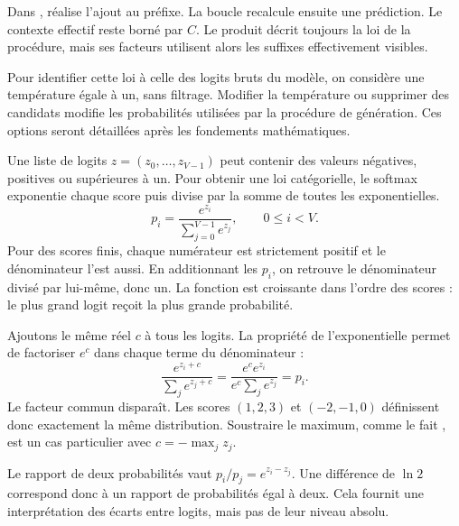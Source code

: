 Dans , 
réalise l'ajout au préfixe. La boucle recalcule ensuite une
prédiction. Le contexte effectif reste borné par \(C\).
Le produit décrit toujours la loi de la procédure, mais ses
facteurs utilisent alors les suffixes effectivement visibles.

Pour identifier cette loi à celle des logits bruts du modèle,
on considère une température égale à un, sans filtrage.
Modifier la température ou supprimer des candidats modifie les
probabilités utilisées par la procédure de génération.
Ces options seront détaillées après les fondements mathématiques.



Une liste de logits \(z=(z_0,\ldots,z_{V-1})\) peut contenir
des valeurs négatives, positives ou supérieures à un. Pour obtenir
une loi catégorielle, le softmax exponentie chaque score puis divise
par la somme de toutes les exponentielles.
\[
 p_i=\frac{e^{z_i}}{\sum_{j=0}^{V-1}e^{z_j}},
 \qquad 0\leq i<V.
\]
Pour des scores finis, chaque numérateur est strictement positif
et le dénominateur l'est aussi. En additionnant les \(p_i\),
on retrouve le dénominateur divisé par lui-même, donc un.
La fonction est croissante dans l'ordre des scores :
le plus grand logit reçoit la plus grande probabilité.

Ajoutons le même réel \(c\) à tous les logits. La propriété
de l'exponentielle permet de factoriser \(e^c\) dans chaque
terme du dénominateur :
\[
 \frac{e^{z_i+c}}{\sum_j e^{z_j+c}}
 =\frac{e^c e^{z_i}}{e^c\sum_j e^{z_j}}
 =p_i.
\]
Le facteur commun disparaît. Les scores \((1,2,3)\) et
\((-2,-1,0)\) définissent donc exactement la même distribution.
Soustraire le maximum, comme le fait ,
est un cas particulier avec \(c=-\max_j z_j\).

Le rapport de deux probabilités vaut
\(p_i/p_j=e^{z_i-z_j}\). Une différence de \(\ln2\)
correspond donc à un rapport de probabilités égal à deux.
Cela fournit une interprétation des écarts entre logits,
mais pas de leur niveau absolu.

